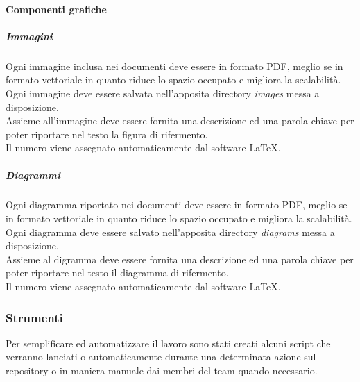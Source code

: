			\paragraph{Componenti grafiche}
				
				\subparagraph{Immagini}
				Ogni immagine inclusa nei documenti deve essere in formato PDF, meglio se in formato vettoriale in quanto riduce lo spazio occupato e migliora la scalabilità.\\
				Ogni immagine deve essere salvata nell'apposita directory \emph{images} messa a disposizione.\\
				Assieme all'immagine deve essere fornita una descrizione ed una parola chiave per poter riportare nel testo la figura di rifermento.\\
				Il numero viene assegnato automaticamente dal software \LaTeX.

				\subparagraph{Diagrammi}
				Ogni diagramma riportato nei documenti deve essere in formato PDF, meglio se in formato vettoriale in quanto riduce lo spazio occupato e migliora la scalabilità.\\
				Ogni diagramma deve essere salvato nell'apposita directory \emph{diagrams} messa a disposizione.\\
				Assieme al digramma deve essere fornita una descrizione ed una parola chiave per poter riportare nel testo il diagramma di rifermento.\\
				Il numero viene assegnato automaticamente dal software \LaTeX.
				
		
		\subsubsection{Strumenti} %
		\label{ssub:strumenti}
		Per semplificare ed automatizzare il lavoro sono stati creati alcuni script che verranno lanciati o automaticamente durante una determinata azione sul repository o in maniera manuale dai membri del team quando necessario.
